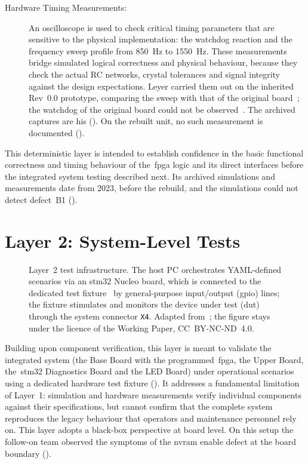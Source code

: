 \begin{description}
	\item[Hardware Timing Measurements:] An oscilloscope is used to check critical timing parameters that are sensitive to the physical implementation: the watchdog reaction and the frequency sweep profile from \SI{850}{\hertz} to \SI{1550}{\hertz}. These measurements bridge simulated logical correctness and physical behaviour, because they check the actual RC networks, crystal tolerances and signal integrity against the design expectations. Leyer carried them out on the inherited Rev~0.0 prototype, comparing the sweep with that of the original board~\cite[Sec.~4.10]{leyer2023}; the watchdog of the original board could not be observed~\cite[Sec.~4.6]{leyer2023}. The archived captures are his (). On the rebuilt unit, no such measurement is documented ().
\end{description}
This deterministic layer is intended to establish confidence in the basic functional correctness and timing behaviour of the~\gls{fpga} logic and its direct interfaces before the integrated system testing described next. Its archived simulations and measurements date from 2023, before the rebuild, and the simulations could not detect defect~B1 ().

\section{Layer 2: System-Level Tests}
\label{sec:system_scenario_testing}

\begin{figure}[htbp]
	\centering
	
	\caption[Layer 2 Test Infrastructure]{Layer~2 test infrastructure. The host PC orchestrates YAML-defined scenarios via an \gls{stm32} Nucleo board, which is connected to the dedicated test fixture~\cite{dolata2023} by general-purpose input/output (\acrshort{gpio}) lines; the fixture stimulates and monitors the device under test (\acrshort{dut}) through the system connector \texttt{X4}. Adapted from~\cite[Fig.~4]{torun2026}; the figure stays under the licence of the Working Paper, \mbox{CC~BY-NC-ND~4.0}.}
	\label{fig:layer2_setup}
\end{figure}

Building upon component verification, this layer is meant to validate the integrated system (the Base Board with the programmed~\gls{fpga}, the Upper Board, the~\gls{stm32} Diagnostics Board and the LED Board) under operational scenarios using a dedicated hardware test fixture (). It addresses a fundamental limitation of Layer~1: simulation and hardware measurements verify individual components against their specifications, but cannot confirm that the complete system reproduces the legacy behaviour that operators and maintenance personnel rely on. This layer adopts a black-box perspective at board level. On this setup the follow-on team observed the symptoms of the \gls{nvram} enable defect at the board boundary ().

